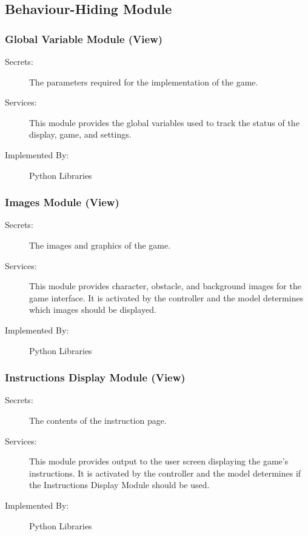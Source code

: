 \documentclass[12pt, titlepage]{article}
\begin{document}
\subsection{Behaviour-Hiding Module}

\subsubsection{Global Variable Module (View)}

\begin{description}
\item[Secrets:] The parameters required for the implementation of the game.
\item[Services:] This module provides the global variables used to track the status of the display, game, and settings. 
\item[Implemented By:] Python Libraries
\end{description}

\subsubsection{Images Module (View)}
\begin{description}
\item[Secrets:]The images and graphics of the game.
\item[Services:] This module provides character, obstacle, and background images for the game interface. It is activated by the controller and the model determines which images should be displayed.
\item[Implemented By:] Python Libraries
\end{description}

\subsubsection{Instructions Display Module (View)}
\begin{description}
\item[Secrets:]The contents of the instruction page. 
\item[Services:] This module provides output to the user screen displaying the game's instructions. It is activated by the controller and the model determines if the Instructions Display Module should be used. 
\item[Implemented By:] Python Libraries
\end{description}
\end{document}
